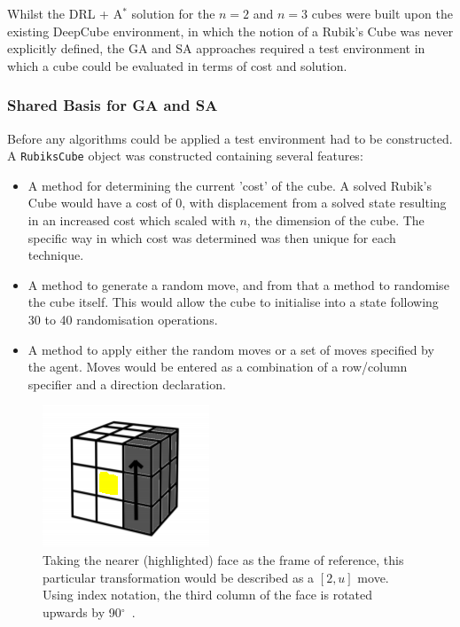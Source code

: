 \documentclass[UKenglish]{libraries/svproc}
\begin{document}
Whilst the DRL + A$^{\ast}$ solution for the $n=2$ and $n=3$ cubes were built upon the existing DeepCube environment, in which the notion of a Rubik's Cube was never explicitly defined, the GA and SA approaches required a test environment in which a cube could be evaluated in terms of cost and solution.

\subsubsection{Shared Basis for GA and SA}
Before any algorithms could be applied a test environment had to be constructed. A \verb|RubiksCube| object was constructed containing several features:
\begin{itemize}
    \item A method for determining the current 'cost' of the cube. A solved Rubik's Cube would have a cost of 0, with displacement from a solved state resulting in an increased cost which scaled with $n$, the dimension of the cube. The specific way in which cost was determined was then unique for each technique.
    \item A method to generate a random move, and from that a method to randomise the cube itself. This would allow the cube to initialise into a state following 30 to 40 randomisation operations.
    \item A method to apply either the random moves or a set of moves specified by the agent. Moves would be entered as a combination of a row/column specifier and a direction declaration.
\end{itemize}

\begin{figure}[!h]
\begin{small}
\centering
\linespread{1.0}
\includegraphics[width=0.75\linewidth]{images/move_3u}
\caption{Taking the nearer (highlighted) face as the frame of reference, this particular transformation would be described as a $[2,u]$ move. Using index notation, the third column of the face is rotated upwards by 90$^{\circ}$~\cite{proj_l.hoang}.}
\label{fig:fig2}
\end{small}
\end{figure}
\end{document}

